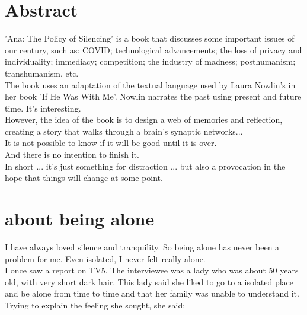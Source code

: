 \documentclass[11pt]{book}
\title{\textbf{Ana} \\ \vskip 1em \small The policy of silencing}
\author{Tatiana Balbi Fraga}
\date{}
\begin{document}
\maketitle

\chapter*{Abstract}

'Ana: The Policy of Silencing' is a book that discusses some important issues of our century, such as: COVID; technological advancements; the loss of privacy and individuality; immediacy; competition; the industry of madness; posthumanism; transhumanism, etc. \\

\noindent The book uses an adaptation of the textual language used by Laura Nowlin's in her book 'If He Was With Me'. Nowlin narrates the past using present and future time. It's interesting. \\

\noindent However, the idea of the book is to design a web of memories and reflection, creating a story that walks through a brain's synaptic networks... \\

\noindent It is not possible to know if it will be good until it is over. \\

\noindent And there is no intention to finish it. \\

\noindent In short ... it's just something for distraction ... but also a provocation in the hope that things will change at some point. \\

\thispagestyle{empty}

\chapter{about being alone}

I have always loved silence and tranquility. So being alone has never been a problem for me. Even isolated, I never felt really alone. \\

\noindent I once saw a report on TV5. The interviewee was a lady who was about 50 years old, with very short dark hair. This lady said she liked to go to a isolated place and be alone from time to time and that her family was unable to understand it. Trying to explain the feeling she sought, she said:
\end{document}
